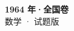 \documentclass[zihao=-4, a4paper]{ctexart}
\begin{document}
\begin{center}
  {\Large\bfseries 1964 年·全国卷}\\[4pt]
  {\large 数学 · 试题版}
\end{center}
\medskip
{}

\end{document}
